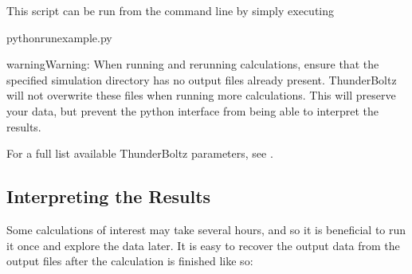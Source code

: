 \documentclass[letterpaper,10pt,english,openany,oneside]{sphinxmanual}
\begin{document}
\sphinxAtStartPar
This script can be run from the command line by simply executing

\begin{sphinxVerbatim}[commandchars=\\\{\}]
pythonrun\PYGZus{}example.py
\end{sphinxVerbatim}

\begin{sphinxadmonition}{warning}{Warning:}
\sphinxAtStartPar
When running and rerunning calculations, ensure that the specified simulation
directory has no output files already present. ThunderBoltz will not
overwrite these files when running more calculations. This will preserve
your data, but prevent the python interface from being able to interpret
the results.
\end{sphinxadmonition}

\sphinxAtStartPar
For a full list available ThunderBoltz parameters, see {\hyperref[\detokenize{params::doc}]{}}.


\subsection{Interpreting the Results}
\label{\detokenize{quickstart:interpreting-the-results}}
\sphinxAtStartPar
Some calculations of interest may take several hours, and so it is
beneficial to run it once and explore the data later. It is easy
to recover the output data from the output files after the calculation
is finished like so:
\end{document}
